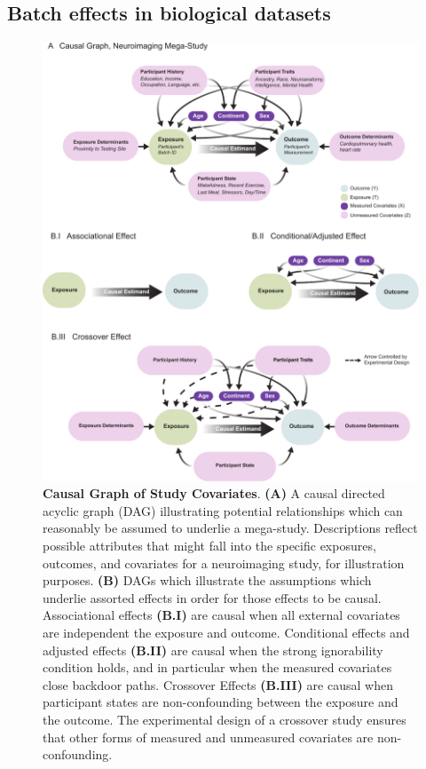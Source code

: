 \subsection{Batch effects in biological datasets}

\begin{figure}[!h]
    \centering \includegraphics[width=\linewidth]{Figures/Content/CoRR_dag.pdf}
    \caption{\textbf{Causal Graph of Study Covariates}. \textbf{(A)} A causal directed acyclic graph (DAG) illustrating potential relationships which can reasonably be assumed to underlie a mega-study. Descriptions reflect possible attributes that might fall into the specific exposures, outcomes, and covariates for a neuroimaging study, for illustration purposes. \textbf{(B)} DAGs which illustrate the assumptions which underlie assorted effects in order for those effects to be causal. Associational effects \textbf{(B.I)} are causal when all external covariates are independent the exposure and outcome. Conditional effects and adjusted effects \textbf{(B.II)} are causal when the strong ignorability condition holds, and in particular when the measured covariates close backdoor paths. Crossover Effects \textbf{(B.III)} are causal when participant states are non-confounding between the exposure and the outcome. The experimental design of a crossover study ensures that other forms of measured and unmeasured covariates are non-confounding.}
    \label{fig:dag}
\end{figure}
